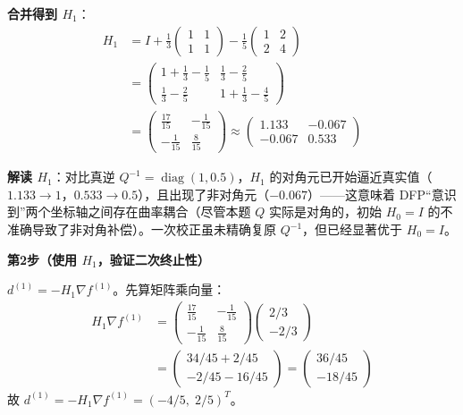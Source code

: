 {\textbf{合并得到 $H_1$}：
\begin{align*}
H_1 &= I + \frac{1}{3}\begin{pmatrix} 1 & 1 \\ 1 & 1 \end{pmatrix}
            - \frac{1}{5}\begin{pmatrix} 1 & 2 \\ 2 & 4 \end{pmatrix} \\[4pt]
    &= \begin{pmatrix} 1+\frac{1}{3}-\frac{1}{5} & \frac{1}{3}-\frac{2}{5} \\[4pt]
                       \frac{1}{3}-\frac{2}{5} & 1+\frac{1}{3}-\frac{4}{5} \end{pmatrix} \\[4pt]
    &= \begin{pmatrix} \frac{17}{15} & -\frac{1}{15} \\[4pt]
                       -\frac{1}{15} & \frac{8}{15} \end{pmatrix}
\approx \begin{pmatrix} 1.133 & -0.067 \\ -0.067 & 0.533 \end{pmatrix}
\end{align*}

\textbf{解读 $H_1$}：对比真逆 $Q^{-1} = \operatorname{diag}(1, 0.5)$，$H_1$ 的对角元已开始逼近真实值（$1.133\to 1$，$0.533\to 0.5$），且出现了非对角元（$-0.067$）——这意味着 DFP``意识到''两个坐标轴之间存在曲率耦合（尽管本题 $Q$ 实际是对角的，初始 $H_0=I$ 的不准确导致了非对角补偿）。一次校正虽未精确复原 $Q^{-1}$，但已经显著优于 $H_0 = I$。

\textbf{第2步（使用 $H_1$，验证二次终止性）}

$d^{(1)} = -H_1 \nabla f^{(1)}$。先算矩阵乘向量：
\begin{align*}
H_1\nabla f^{(1)}
&= \begin{pmatrix} \frac{17}{15} & -\frac{1}{15} \\[4pt]
                   -\frac{1}{15} & \frac{8}{15} \end{pmatrix}
   \begin{pmatrix} 2/3 \\[2pt] -2/3 \end{pmatrix} \\
&= \begin{pmatrix} 34/45 + 2/45 \\ -2/45 - 16/45 \end{pmatrix}
 = \begin{pmatrix} 36/45 \\ -18/45 \end{pmatrix}
\end{align*}
故 $d^{(1)} = -H_1\nabla f^{(1)} = (-4/5,\; 2/5)^T$。

}
